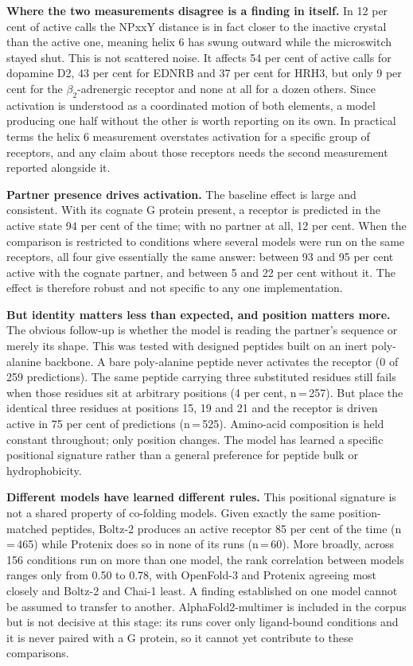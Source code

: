 \documentclass[11pt,a4paper]{article}
\begin{document}
\textbf{Where the two measurements disagree is a finding in itself.} In 12 per cent of active calls
the NPxxY distance is in fact closer to the inactive crystal than the active one, meaning helix 6 has
swung outward while the microswitch stayed shut. This is not scattered noise. It affects 54 per cent
of active calls for dopamine D2, 43 per cent for EDNRB and 37 per cent for HRH3, but only 9 per cent
for the $\beta_2$-adrenergic receptor and none at all for a dozen others. Since activation is
understood as a coordinated motion of both elements, a model producing one half without the other is
worth reporting on its own. In practical terms the helix 6 measurement overstates activation for a
specific group of receptors, and any claim about those receptors needs the second measurement
reported alongside it.

\textbf{Partner presence drives activation.} The baseline effect is large and consistent. With its
cognate G protein present, a receptor is predicted in the active state 94 per cent of the time;
with no partner at all, 12 per cent. When the comparison is restricted to conditions where several
models were run on the same receptors, all four give essentially the same answer: between 93 and
95 per cent active with the cognate partner, and between 5 and 22 per cent without it. The effect
is therefore robust and not specific to any one implementation.

\textbf{But identity matters less than expected, and position matters more.} The obvious follow-up
is whether the model is reading the partner's sequence or merely its shape. This was tested with
designed peptides built on an inert poly-alanine backbone. A bare poly-alanine peptide never
activates the receptor (0 of 259 predictions). The same peptide carrying three substituted residues
still fails when those residues sit at arbitrary positions (4 per cent, n\,=\,257). But place the
identical three residues at positions 15, 19 and 21 and the receptor is driven active in 75 per cent
of predictions (n\,=\,525). Amino-acid composition is held constant throughout; only position
changes. The model has learned a specific positional signature rather than a general preference for
peptide bulk or hydrophobicity.

\textbf{Different models have learned different rules.} This positional signature is not a shared
property of co-folding models. Given exactly the same position-matched peptides, Boltz-2 produces an
active receptor 85 per cent of the time (n\,=\,465) while Protenix does so in none of its runs
(n\,=\,60). More broadly, across 156 conditions run on more than one model, the rank correlation
between models ranges only from 0.50 to 0.78, with OpenFold-3 and Protenix
agreeing most closely and Boltz-2 and Chai-1 least. A finding established on one model cannot be assumed to transfer to
another. AlphaFold2-multimer is included in the corpus but is not decisive at this stage: its runs
cover only ligand-bound conditions and it is never paired with a G protein, so it cannot yet
contribute to these comparisons.
\end{document}
